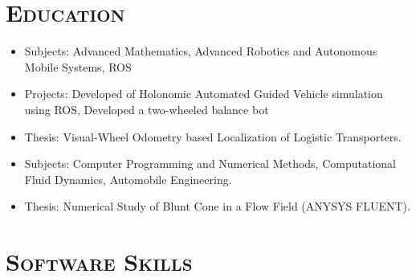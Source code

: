 \documentclass[11pt,a4paper,roman]{moderncv} %
\begin{document}
\section{\scshape{Education}}

{
\begin{itemize}
\item Subjects: Advanced Mathematics, Advanced Robotics and Autonomous Mobile Systems, ROS
\item Projects: Developed of Holonomic Automated Guided Vehicle simulation using ROS, Developed a two-wheeled balance bot
\item Thesis: Visual-Wheel Odometry based Localization of Logistic Transporters.
\newline{}
\end{itemize}
}

{
\begin{itemize}
\item Subjects: Computer Programming and Numerical Methods, Computational Fluid Dynamics, Automobile Engineering.
\item Thesis: Numerical Study of Blunt Cone in a Flow Field (ANYSYS FLUENT).
\end{itemize}
}

\newpage

\section{\scshape{Software Skills}}



\end{document}

